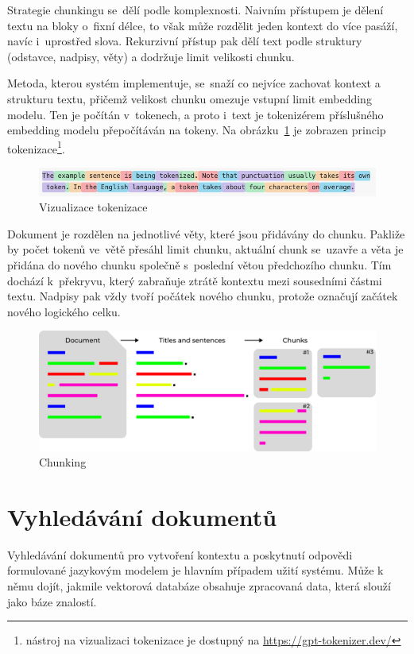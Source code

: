 Strategie chunkingu se~dělí podle komplexnosti. Naivním přístupem je dělení textu na bloky o~fixní délce, to však může rozdělit jeden kontext do více pasáží, navíc i~uprostřed slova. Rekurzivní přístup pak dělí text podle struktury (odstavce, nadpisy, věty) a dodržuje limit velikosti chunku.

Metoda, kterou systém implementuje, se~snaží co nejvíce zachovat kontext a strukturu textu, přičemž velikost chunku omezuje vstupní limit embedding modelu. Ten je počítán v~tokenech, a proto i~text je tokenizérem příslušného embedding modelu přepočítáván na tokeny. Na obrázku~\ref{fig:tokenizer} je zobrazen princip tokenizace\footnote{nástroj na vizualizaci tokenizace je dostupný na \url{https://gpt-tokenizer.dev/}}.

\begin{figure}[H]
    \centering
    \includegraphics[width=1\linewidth]{obrazky/tokens.jpg}
    \caption{Vizualizace tokenizace}
    \label{fig:tokenizer}
\end{figure}

Dokument je rozdělen na jednotlivé věty, které jsou přidávány do chunku. Pakliže by počet tokenů ve~větě přesáhl limit chunku, aktuální chunk se~uzavře a věta je přidána do nového chunku společně s~poslední větou předchozího chunku. Tím dochází k~překryvu, který zabraňuje ztrátě kontextu mezi sousedními částmi textu. Nadpisy pak vždy tvoří počátek nového chunku, protože označují začátek nového logického celku.

\begin{figure}[H]
    \centering
    \includegraphics[width=1\linewidth]{obrazky/chunking.pdf}
    \caption{Chunking}
    \label{fig:chunking}
\end{figure}


\section{Vyhledávání dokumentů}
\label{vyhledavani}
Vyhledávání dokumentů pro vytvoření kontextu a poskytnutí odpovědi formulované jazykovým modelem je hlavním případem užití systému. Může k němu dojít, jakmile vektorová databáze obsahuje zpracovaná data, která slouží jako báze znalostí.

